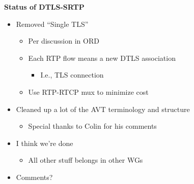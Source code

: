 \documentclass[helvetica]{seminar}
\newcommand{\heading}[1]{%
  \begin{center} 
    \large\bf 
    #1 
  \end{center} 
  \vspace{.4 in}}
\begin{document}
\begin{slide}
\heading{Status of DTLS-SRTP}

\begin{itemize}
\item Removed ``Single TLS''
\begin{itemize}
\item Per discussion in ORD
\item Each RTP flow means a new DTLS association
\begin{itemize}
\item I.e., TLS connection
\end{itemize}
\item Use RTP-RTCP mux to minimize cost
\end{itemize}
\item Cleaned up a lot of the AVT terminology and structure
\begin{itemize}
\item Special thanks to Colin for his comments
\end{itemize}
\item I think we're done
\begin{itemize}
\item All other stuff belongs in other WGs
\end{itemize}
\item Comments?
\end{itemize}
\end{slide}
\end{document}
